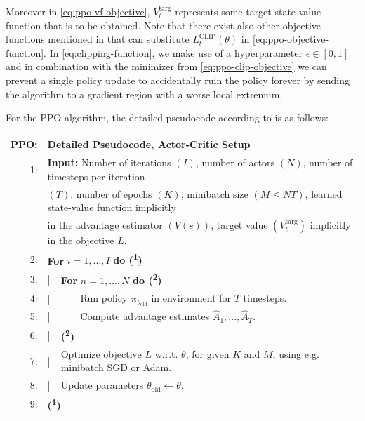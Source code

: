 \noindent Moreover in \eqref{eq:ppo-vf-objective}, $V_{t}^{\text{targ}}$ represents some target state-value function that is to be obtained. Note that there exist also other objective functions mentioned in \cite{ppo-paper} that can substitute $L_{t}^{\text{CLIP}}(\theta)$ in \eqref{eq:ppo-objective-function}. In \eqref{eq:clipping-function}, we make use of a hyperparameter $\epsilon \in [0, 1]$ and in combination with the minimizer from \eqref{eq:ppo-clip-objective} we can prevent a single policy update to accidentally ruin the policy forever by sending the algorithm to a gradient region with a worse local extremum.

\noindent For the \textsc{PPO} algorithm, the detailed pseudocode according to \cite{ppo-paper} is as follows:

\begin{table}[h!]
  \centering
  \begin{tabular}{rlll}
    \hline\hline
    \textbf{PPO:} & \multicolumn{3}{l}{Detailed Pseudocode, Actor-Critic Setup}\\
    \hline
    1: & \multicolumn{3}{l}{\textbf{Input:} Number of iterations $\left(I\right)$, number of actors $\left(N\right)$, number of timesteps per iteration}\\
    & \multicolumn{3}{l}{$\left(T\right)$, number of epochs $(K)$, minibatch size $(M \leq NT)$, learned state-value function implicitly}\\
    & \multicolumn{3}{l}{in the advantage estimator $(V(s))$, target value $(V_{t}^{\text{targ}})$ implicitly in the objective $L$.}\\
    2: & \multicolumn{3}{l}{\textbf{For} $i = 1, ..., I$ \textbf{do (\textsuperscript{1})}}\\
    3: & | & \multicolumn{2}{l}{\textbf{For} $n = 1, ..., N$ \textbf{do (\textsuperscript{2})}}\\
    4: & | & | & Run policy $\boldsymbol{\pi}_{\theta_{\text{old}}}$ in environment for $T$ timesteps.\\
    5: & | & | & Compute advantage estimates $\hat{A}_{1}, ..., \hat{A}_{T}$.\\
    6: & | & \multicolumn{2}{l}{\textbf{(\textsuperscript{2})}}\\
    7: & | & \multicolumn{2}{l}{Optimize objective $L$ w.r.t. $\theta$, for given $K$ and $M$, using e.g. minibatch SGD or Adam.}\\
    8: & | & \multicolumn{2}{l}{Update parameters $\theta_{\text{old}} \leftarrow \theta$.}\\
    9: & \multicolumn{3}{l}{\textbf{(\textsuperscript{1})}}\\
    \hline\hline
  \end{tabular}
\end{table}

